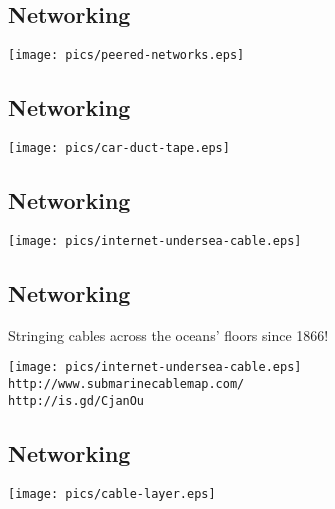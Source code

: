 \documentclass[xga]{xdvislides}
\begin{document}
\subsection{Networking}
\vspace*{\fill}
\begin{center}
	\texttt{[image: pics/peered-networks.eps]} \\
\end{center}
\vspace*{\fill}

\subsection{Networking}
\vspace*{\fill}
\begin{center}
	\texttt{[image: pics/car-duct-tape.eps]} \\
\end{center}
\vspace*{\fill}

\subsection{Networking}
\vspace*{\fill}
\begin{center}
	\texttt{[image: pics/internet-undersea-cable.eps]} \\
\end{center}
\vspace*{\fill}


\subsection{Networking}
Stringing cables across the oceans' floors since 1866!
\vspace*{\fill}
\begin{center}
	\texttt{[image: pics/internet-undersea-cable.eps]} \\
	\verb+http://www.submarinecablemap.com/+ \\
	\verb+http://is.gd/CjanOu+
\end{center}
\vspace*{\fill}

\subsection{Networking}
\vspace*{\fill}
\begin{center}
	\texttt{[image: pics/cable-layer.eps]} \\
\end{center}
\vspace*{\fill}
\end{document}

